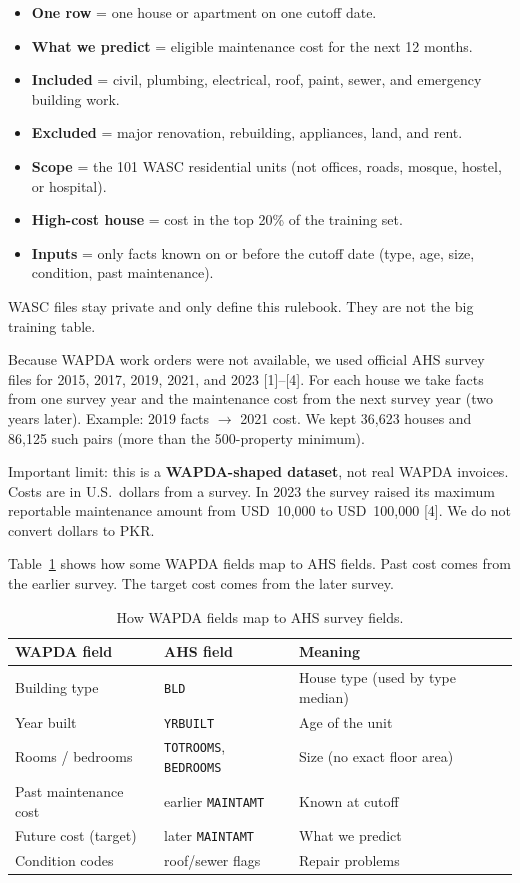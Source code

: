 \documentclass[11pt,a4paper]{article}
\begin{document}
\begin{itemize}
  \item \textbf{One row} = one house or apartment on one cutoff date.
  \item \textbf{What we predict} = eligible maintenance cost for the next 12 months.
  \item \textbf{Included} = civil, plumbing, electrical, roof, paint, sewer, and emergency building work.
  \item \textbf{Excluded} = major renovation, rebuilding, appliances, land, and rent.
  \item \textbf{Scope} = the 101 WASC residential units (not offices, roads, mosque, hostel, or hospital).
  \item \textbf{High-cost house} = cost in the top 20\% of the training set.
  \item \textbf{Inputs} = only facts known on or before the cutoff date (type, age, size, condition, past maintenance).
\end{itemize}

WASC files stay private and only define this rulebook. They are not the big training table.

Because WAPDA work orders were not available, we used official AHS survey files for 2015, 2017, 2019, 2021, and 2023 [1]--[4]. For each house we take facts from one survey year and the maintenance cost from the next survey year (two years later). Example: 2019 facts $\rightarrow$ 2021 cost. We kept 36{,}623 houses and 86{,}125 such pairs (more than the 500-property minimum).

Important limit: this is a \textbf{WAPDA-shaped dataset}, not real WAPDA invoices. Costs are in U.S.\ dollars from a survey. In 2023 the survey raised its maximum reportable maintenance amount from USD~10{,}000 to USD~100{,}000 [4]. We do not convert dollars to PKR.

Table~\ref{tab:map} shows how some WAPDA fields map to AHS fields. Past cost comes from the earlier survey. The target cost comes from the later survey.

\begin{table}[ht]
\centering
\caption{How WAPDA fields map to AHS survey fields.}
\label{tab:map}
\begin{tabular}{@{}llp{5.4cm}@{}}
\toprule
WAPDA field & AHS field & Meaning \\
\midrule
Building type & \texttt{BLD} & House type (used by type median) \\
Year built & \texttt{YRBUILT} & Age of the unit \\
Rooms / bedrooms & \texttt{TOTROOMS}, \texttt{BEDROOMS} & Size (no exact floor area) \\
Past maintenance cost & earlier \texttt{MAINTAMT} & Known at cutoff \\
Future cost (target) & later \texttt{MAINTAMT} & What we predict \\
Condition codes & roof/sewer flags & Repair problems \\
\bottomrule
\end{tabular}
\end{table}
\end{document}
